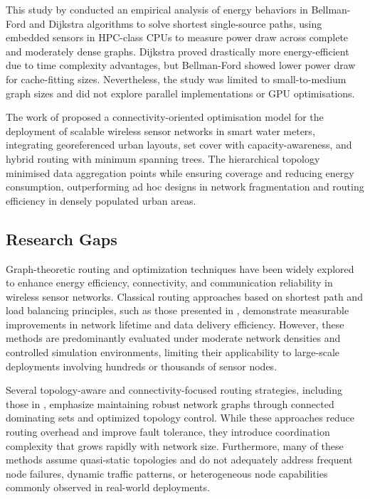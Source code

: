 \documentclass[a4paper,fleqn]{cas-dc}
\numberwithin{equation}{section}
\begin{document}
This study by \cite{B5} conducted an empirical analysis of energy behaviors in Bellman-Ford and Dijkstra algorithms to solve shortest single-source paths, using embedded sensors in HPC-class CPUs to measure power draw across complete and moderately dense graphs. Dijkstra proved drastically more energy-efficient due to time complexity advantages, but Bellman-Ford showed lower power draw for cache-fitting sizes. Nevertheless, the study was limited to small-to-medium graph sizes and did not explore parallel implementations or GPU optimisations.

The work of \cite{B6} proposed a connectivity-oriented optimisation model for the deployment of scalable wireless sensor networks in smart water meters, integrating georeferenced urban layouts, set cover with capacity-awareness, and hybrid routing with minimum spanning trees. The hierarchical topology minimised data aggregation points while ensuring coverage and reducing energy consumption, outperforming ad hoc designs in network fragmentation and routing efficiency in densely populated urban areas.

\subsection{Research Gaps}

Graph-theoretic routing and optimization techniques have been widely explored to enhance energy efficiency, connectivity, and communication reliability in wireless sensor networks. Classical routing approaches based on shortest path and load balancing principles, such as those presented in \cite{B1,B2,B3}, demonstrate measurable improvements in network lifetime and data delivery efficiency. However, these methods are predominantly evaluated under moderate network densities and controlled simulation environments, limiting their applicability to large-scale deployments involving hundreds or thousands of sensor nodes.

Several topology-aware and connectivity-focused routing strategies, including those in \cite{B4,B6,r6,r7}, emphasize maintaining robust network graphs through connected dominating sets and optimized topology control. While these approaches reduce routing overhead and improve fault tolerance, they introduce coordination complexity that grows rapidly with network size. Furthermore, many of these methods assume quasi-static topologies and do not adequately address frequent node failures, dynamic traffic patterns, or heterogeneous node capabilities commonly observed in real-world deployments.
\end{document}
